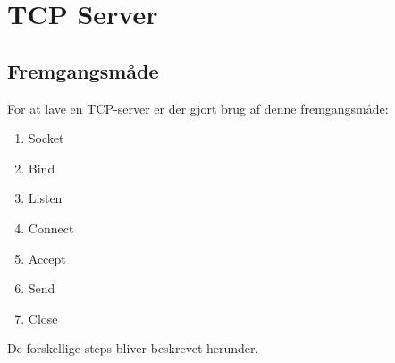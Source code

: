 \documentclass[12pt,fleqn,a4paper]{report}
\begin{document}


\newpage

\chapter{TCP Server}


\section{Fremgangsmåde}
For at lave en TCP-server er der gjort brug af denne fremgangsmåde:
\begin{enumerate}
	\item Socket
	\item Bind
	\item Listen
	\item Connect
	\item Accept
	\item Send
	\item Close
\end{enumerate}
De forskellige steps bliver beskrevet herunder.
\end{document}
